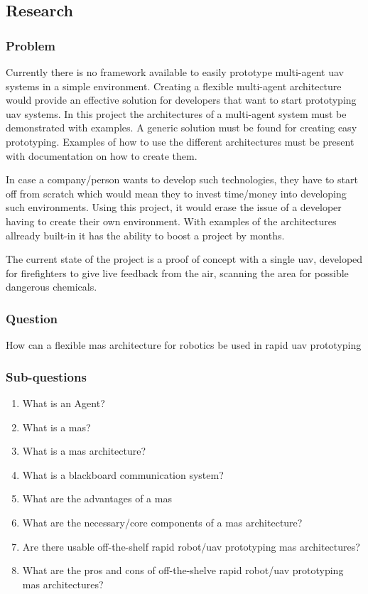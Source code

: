 \subsection{Research}
\subsubsection{Problem}

Currently there is no framework available to easily prototype multi-agent \acs{uav} systems in a simple environment. Creating a flexible multi-agent architecture would provide an effective solution for developers that want to start prototyping \acs{uav} systems. In this project 
the architectures of a multi-agent system must be demonstrated with examples. A generic solution must be found for creating easy prototyping.
Examples of how to use the different architectures must be present with documentation on how to create them.

In case a company/person wants to develop such technologies, they have to start off from scratch which would mean they 
to invest time/money into developing such environments. Using this project, it would erase the issue of a developer having 
to create their own environment. With examples of the architectures allready built-in it has the ability to boost a project by months.

The current state of the project is a proof of concept with a single \acs{uav}, developed for firefighters to give live feedback from the air, scanning the area for possible dangerous chemicals.

\subsubsection{Question}

How can a flexible \acs{mas} architecture for robotics be used in rapid \acs{uav} prototyping

\subsubsection{Sub-questions}
\begin{enumerate}
    \item What is an Agent?
    \item What is a \acs{mas}?
    \item What is a \acs{mas} architecture?
    \item What is a blackboard communication system?
    \item What are the advantages of a \acs{mas}
    \item What are the necessary/core components of a \acs{mas} architecture?
    \item Are there usable off-the-shelf rapid robot/\acs{uav} prototyping \acs{mas} architectures?
    \item What are the pros and cons of off-the-shelve rapid robot/\acs{uav} prototyping \acs{mas} architectures?
  \end{enumerate}
\newpage

